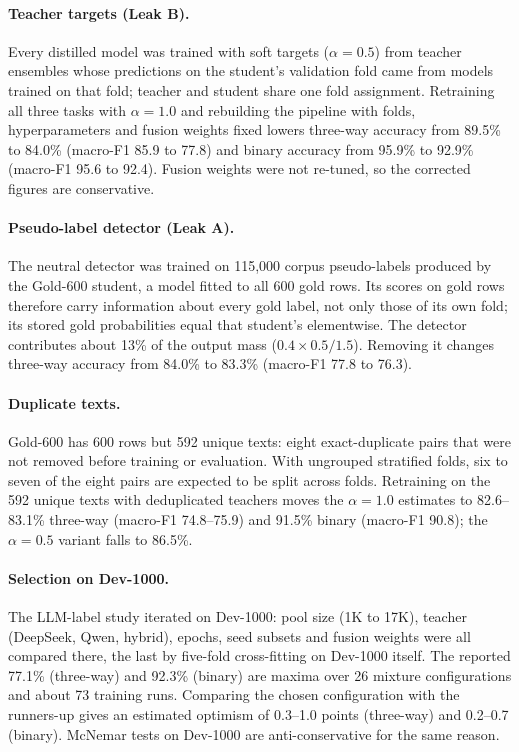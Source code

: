 \paragraph{Teacher targets (Leak B).}
Every distilled model was trained with soft targets
($\alpha{=}0.5$) from teacher ensembles whose predictions on the
student's validation fold came from models trained on that fold;
teacher and student share one fold assignment. Retraining all three
tasks with $\alpha{=}1.0$ and rebuilding the pipeline with folds,
hyperparameters and fusion weights fixed lowers three-way accuracy
from 89.5\% to 84.0\% (macro-F1 85.9 to 77.8) and binary accuracy
from 95.9\% to 92.9\% (macro-F1 95.6 to 92.4). Fusion weights were
not re-tuned, so the corrected figures are conservative.

\paragraph{Pseudo-label detector (Leak A).}
The neutral detector was trained on 115{,}000 corpus pseudo-labels
produced by the Gold-600 student, a model fitted to all 600 gold
rows. Its scores on gold rows therefore carry information about every
gold label, not only those of its own fold; its stored gold
probabilities equal that student's elementwise. The detector
contributes about 13\% of the output mass ($0.4 \times 0.5/1.5$).
Removing it changes three-way accuracy from 84.0\% to 83.3\%
(macro-F1 77.8 to 76.3).

\paragraph{Duplicate texts.}
Gold-600 has 600 rows but 592 unique texts: eight exact-duplicate
pairs that were not removed before training or evaluation. With
ungrouped stratified folds, six to seven of the eight pairs are
expected to be split across folds. Retraining on the 592 unique texts
with deduplicated teachers moves the $\alpha{=}1.0$ estimates to
82.6--83.1\% three-way (macro-F1 74.8--75.9) and 91.5\% binary
(macro-F1 90.8); the $\alpha{=}0.5$ variant falls to 86.5\%.

\paragraph{Selection on Dev-1000.}
The LLM-label study iterated on Dev-1000: pool size (1K to 17K),
teacher (DeepSeek, Qwen, hybrid), epochs, seed subsets and fusion
weights were all compared there, the last by five-fold cross-fitting
on Dev-1000 itself. The reported 77.1\% (three-way) and 92.3\%
(binary) are maxima over 26 mixture configurations and about 73
training runs. Comparing the chosen configuration with the runners-up
gives an estimated optimism of 0.3--1.0 points (three-way) and
0.2--0.7 (binary). McNemar tests on Dev-1000 are anti-conservative
for the same reason.

